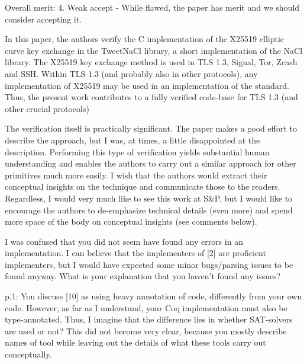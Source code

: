 Overall merit: 4. Weak accept - While flawed, the paper has merit and we should
consider accepting it.


\begin{center}
\end{center}

In this paper, the authors verify the C implementation of the X25519 elliptic
curve key exchange in the TweetNaCl library, a short implementation of the NaCl
library. The X25519 key exchange method is used in TLS 1.3, Signal, Tor, Zcash
and SSH. Within TLS 1.3 (and probably also in other protocols), any implementation
of X25519 may be used in an implementation of the standard. Thus, the present
work contributes to a fully verified code-base for TLS 1.3 (and other crucial
protocols)

The verification itself is practically significant. The paper makes a good
effort to describe the approach, but I was, at times, a little disappointed at
the description. Performing this type of verification yields substantial human
understanding and enables the authors to carry out a similar approach for other
primitives much more easily. I wish that the authors would extract their conceptual
insights on the technique and communicate those to the readers. Regardless, I
would very much like to see this work at S\&P, but I would like to encourage the
authors to de-emphasize technical details (even more) and spend more space of
the body on conceptual insights (see comments below).


\begin{center}
\end{center}

I was confused that you did not seem have found any errors in an implementation.
I can believe that the implementers of [2] are proficient implementers, but I
would have expected some minor bugs/parsing issues to be found anyway. What is
your explanation that you haven't found any issues?

p.1: You discuss [10] as using heavy annotation of code, differently from your
own code. However, as far as I understand, your Coq implementation must also be
type-annotated. Thus, I imagine that the difference lies in whether SAT-solvers
are used or not? This did not become very clear, because you mostly describe
names of tool while leaving out the details of what these tools carry out
conceptually.

